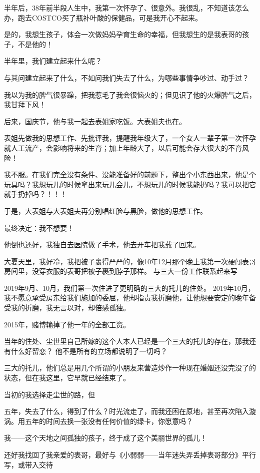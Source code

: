 \documentclass[9pt, b5paper]{article}
\begin{document}
半年后，38年前半段人生中，我第一次怀孕了、很意外。我很乱，不知道该怎么办，跑去COSTCO买了瓶补叶酸的保健品，可是我开心不起来。

是的，我想生孩子，体会一次做妈妈孕育生命的幸福，但我想生的是我表哥的孩子，不是他的！

半年里，我们建立起来什么呢？

与其问建立起来了什么，不如问我们失去了什么，为哪些事情争吵过、动手过？

我以为我的脾气很暴躁，把我惹毛了我会很恼火的；但见识了他的火爆脾气之后，我甘拜下风！

后来，国庆节，他与我一起去表姐家吃饭。大表姐夫也在。

表姐先做我的思想工作、先批评我，提醒我年级大了，一个女人一辈子第一次怀孕就人工流产，会影响将来的生育；加上年龄大了，以后可能会存大很大的不育风险！

我不服。在我们完全没有条件、没能准备好的前题下，整出个小东西出来，他是个玩具吗？我想玩儿的时候拿出来玩儿会儿，不想玩儿的时候我能扔吗？我可以把它就手扔掉吗？！！！

于是，大表姐与大表姐夫再分别唱红脸与黑脸，做他的思想工作。

最终决定：我不想要！

他倒也还好，我独自去医院做了手术，他去开车把我载了回来。

大夏天里，我好冷，我把被子裹得严严的，像10年12月那个晚上我第一次硬闯表哥房间里，没穿衣服的表哥把被子裹到脖子那样。
与三大一份工作联系起来写

2019年9月、10月，我们第一次住进了更明确的三大的托儿的住处。
2019年10月，我不愿意承受房东给我们施加的委屈，他却指责我折磨他，让他想要安定的晚年备受我的折磨，我无言以对，却倍感孤独。

2015年，赌博输掉了他一年的全部工资。


当年的住处、尘世里自己所嫁的这个人本人已经是一个三大的托儿的存在，那我还有什么好留恋？
他不是所有的立场都说明了一切吗？

三大的托儿，他们总是用几个所谓的小朋友来营造炒作一种现在婚姻还没完没了的状态，但在我这里，它早就已经结束了。

当初的我选择走尘世的路，但

五年，失去了什么，得到了什么？时光流走了，而我还困在原地，甚至再次陷入漩涡。用五年的时间去换一张没有任何价值的绿卡，你愿意吗？

我——这个天地之间孤独的孩子，终于成了这个美丽世界的孤儿！

还好我找回了我亲爱的表哥，最好与《小弱弱——当年迷失弄丢掉表哥部分》平行写，或带入交待
\end{document}
